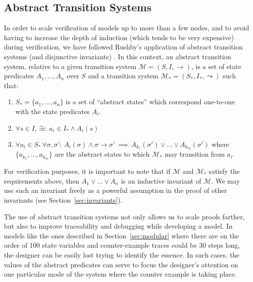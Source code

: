 \documentclass{llncs/llncs}
\newcommand{\tld}[1]{#1_{*}\xspace}
\begin{document}
\subsection{Abstract Transition Systems}\label{sec:abstract}

In order to scale verification of models up to more than a few nodes, and to avoid having to increase the depth of induction (which tends to be very expensive) during verification, we have followed Rushby's  application of abstract transition systems (and disjunctive invariants) \cite{Rushby00:CAV,timed-systems}. In this context, an abstract transition system, relative to a given transition system $\mathcal{M} = (S, I, \rightarrow)$, is a set of state predicates $A_1, \ldots, A_n$ over $S$ and a transition system $\tld{\mathcal{M}} = (\tld{S}, \tld{I}, \leadsto)$ such that:

\begin{enumerate}
    \item $\tld{S} = \{a_1, \ldots, a_n\}$ is a set of ``abstract states'' which correspond one-to-one with the state predicates $A_i$.
    \item $\forall s \in I, \, \exists i : \, a_i \in \tld{I} \wedge A_i(s)$
    \item $\forall a_i \in \tld{S} \, \forall \sigma, \sigma' : \, A_i(\sigma) \wedge \sigma \rightarrow \sigma' \, \implies \, A_{k_1}(\sigma') \vee \ldots \vee A_{k_m}(\sigma')$ where $\{a_{k_1}, \ldots, a_{k_m}\}$ are the abstract states to which $\tld{\mathcal{M}}$ may transition from $a_i$.
\end{enumerate}

For verification purposes, it is important to note that if $\mathcal{M}$ and $\tld{\mathcal{M}}$ satisfy the requirements above, then $A_1 \vee \ldots \vee A_n$ is an inductive invariant of $\mathcal{M}$. We may use such an invariant freely as a powerful assumption in the proof of other invariants (see Section~\ref{sec:invariants}).

The use of abstract transition systems not only allows us to scale proofs farther, but also to improve traceability and debugging while developing a model. In models like the ones described in Section~\ref{sec:modular} where there are on the order of 100 state variables and counter-example traces could be 30 steps long, the designer can be easily lost trying to identify the essence. In such cases, the values of the abstract predicates can serve to focus the designer's attention on one particular mode of the system where the counter example is taking place.
\end{document}
